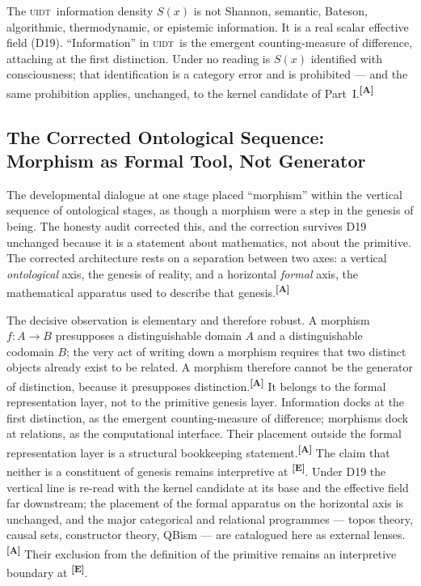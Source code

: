 \documentclass[12pt,a4paper,twoside]{article}
\theoremstyle{plain}
\theoremstyle{definition}
\theoremstyle{remark}
\newcommand{\UIDT}{\textsc{uidt}}
\newcommand{\catmark}[1]{\textsuperscript{\textsf{\textbf{[#1]}}}}
\begin{document}
\begin{governancebox}
The \UIDT\ information density $S(x)$ is not Shannon, semantic, Bateson,
algorithmic, thermodynamic, or epistemic information. It is a real
scalar effective field (D19). ``Information'' in \UIDT\ is the emergent
counting-measure of difference, attaching at the first distinction.
Under no reading is $S(x)$ identified with consciousness; that
identification is a category error and is prohibited --- and the same
prohibition applies, unchanged, to the kernel candidate of
Part~I.\catmark{A}
\end{governancebox}

\subsection{The Corrected Ontological Sequence: Morphism as Formal Tool, Not Generator}
\label{subsec:corrected-sequence}

The developmental dialogue at one stage placed ``morphism'' within the
vertical sequence of ontological stages, as though a morphism were a
step in the genesis of being. The honesty audit corrected this, and the
correction survives D19 unchanged because it is a statement about
mathematics, not about the primitive. The corrected architecture rests
on a separation between two axes: a vertical \emph{ontological} axis,
the genesis of reality, and a horizontal \emph{formal} axis, the
mathematical apparatus used to describe that genesis.\catmark{A}

The decisive observation is elementary and therefore robust. A morphism
$f\colon A\to B$ presupposes a distinguishable domain $A$ and a
distinguishable codomain $B$; the very act of writing down a morphism
requires that two distinct objects already exist to be related. A
morphism therefore cannot be the generator of distinction, because it
presupposes distinction.\catmark{A} It belongs to the formal
representation layer, not to the primitive genesis layer. Information
docks at the first distinction, as the emergent counting-measure of
difference; morphisms dock at relations, as the computational interface.
Their placement outside the formal representation layer is a structural
bookkeeping statement.\catmark{A} The claim that neither is a constituent
of genesis remains interpretive at \catmark{E}. Under D19 the
vertical line is re-read with the kernel candidate at its base and the
effective field far downstream; the placement of the formal apparatus on
the horizontal axis is unchanged, and the major categorical and
relational programmes --- topos theory, causal sets, constructor theory,
QBism --- are catalogued here as external lenses.\catmark{A} Their exclusion
from the definition of the primitive remains an interpretive boundary at
\catmark{E}.
\end{document}
